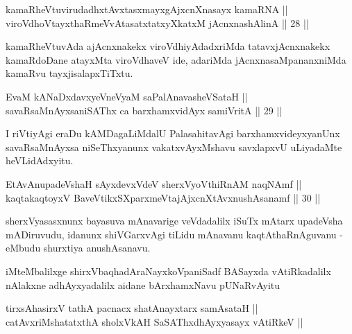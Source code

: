 \begin{shl}
kamaRheVtuvirudadhxtAvxtasxmayxgAjxcnXnasayx kamaRNA || \\
viroVdhoV\s tayxthaRmeVvAtasatxtatxyXkatxM jAcnxnashAlinA ||  28 ||  
\end{shl}

\begin{artha}
kamaRheVtuvAda ajAcnxnakekx viroVdhiyAdadxriMda tatavxjAcnxnakekx kamaRdoDane atayxMta viroVdhaveV ide, adariMda jAcnxnasaMpananxniMda kamaRvu tayxjisalapxTiTxtu.
\end{artha}

\begin{shl}
EvaM kANaDxdavxyeVneVyaM saPalA\s navasheVSataH || \\
savaRsaMnAyxsaniSAThx ca barxhamxvidAyx samiVritA ||  29 ||  
\end{shl}

\begin{artha}
I riVtiyAgi eraDu kAMDagaLiMdalU PalasahitavAgi barxhamxvideyxyanUnx savaRsaMnAyxsa niSeThxyanunx vakatxvAyxMshavu savxlapxvU uLiyadaMte heVLidAdxyitu.
\end{artha}

\begin{shl}
EtAvAnupadeVshaH sAyxdevxVdeV sherxVyoVthiRnAM naqNAmf || \\
kaqtakaqtoyxV BaveVtikxSXparxmeVtajAjxcnXtAvx\s nushAsanamf ||  30 ||  
\end{shl}

\begin{artha}
sherxVyasasxnunx bayasuva mAnavarige veVdadalilx iSuTx mAtarx upadeVsha mADiruvudu, idanunx shiVGarxvAgi tiLidu mAnavanu kaqtAthaRnAguvanu - eMbudu shurxtiya anushAsanavu.
\end{artha}

\begin{center}
iMteMbalilxge shirxVbaqhadAraNayxkoVpaniSadf BASayxda vAtiRkadalilx nAlakxne adhAyxyadalilx aidane bArxhamxNavu pUNaRvAyitu
\end{center}

\begin{shl}		
tirxsAhasirxV tathA pacnacx shatAnayxtarx samAsataH || \\
catAvxriMshatatxthA sholxVkAH SaSAThxdhAyxyasayx vAtiRkeV ||  
\end{shl}

\begin{center}



\end{center}
